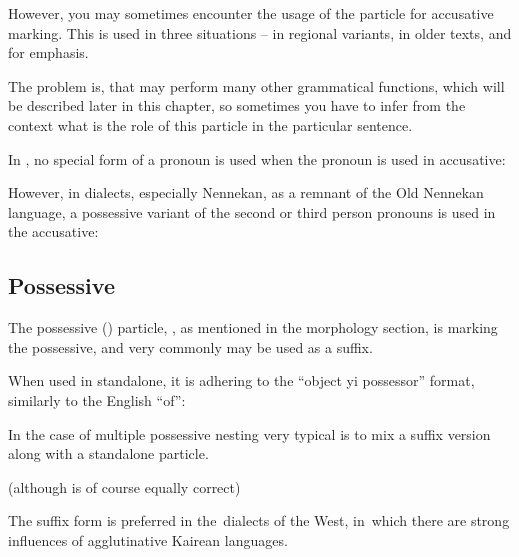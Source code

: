 
However, you may sometimes encounter the usage of the  particle for
accusative marking. This is used in three situations -- in regional variants, in
older texts, and for emphasis.


The problem is, that  may perform many other grammatical functions,
which will be described later in this chapter, so sometimes you have to infer
from the context what is the role of this particle in the particular sentence.

In \ardo, no special form of a pronoun is used when the pronoun is used in
accusative:


However, in dialects, especially Nennekan, as a remnant of the Old Nennekan
language, a possessive variant of the second or third person pronouns is used in
the accusative:


\subsection{Possessive}

The possessive (\Poss{}) particle, , as mentioned in the morphology
section, is marking the possessive, and very commonly may be used as a suffix.

When used in standalone, it is adhering to the ``object yi possessor'' format,
similarly to the English ``of'':


In the case of multiple possessive nesting very typical is to mix a suffix
version along with a standalone particle.


(although  is of course equally
correct)

The suffix form is preferred in the~dialects of the West, in~which there are
strong influences of agglutinative Kairean languages.

